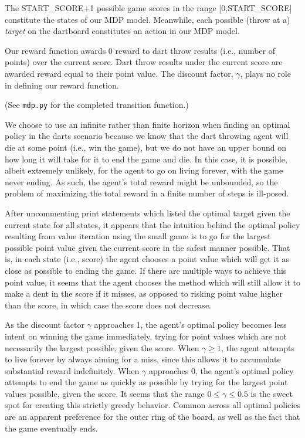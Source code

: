 \documentclass[solution, letterpaper]{cs121}
\begin{document}

\subproblem{} %
The \textsc{START\_SCORE}+1 possible game scores in the range [0,\textsc{START\_SCORE}] constitute the states of our MDP model. Meanwhile, each possible (throw at a) \emph{target} on the dartboard constitutes an action in our MDP model.

\subproblem{} %
Our reward function awards 0 reward to dart throw results (i.e., number of points) over the current score. Dart throw results under the current score are awarded reward equal to their point value. The discount factor, $\gamma$, plays no role in defining our reward function.

\subproblem{} %
(See {\tt mdp.py} for the completed transition function.)

\subproblem{} %
We choose to use an infinite rather than finite horizon when finding an optimal policy in the darts scenario because we know that the dart throwing agent will die at some point (i.e., win the game), but we do not have an upper bound on how long it will take for it to end the game and die. In this case, it is possible, albeit extremely unlikely, for the agent to go on living forever, with the game never ending. As such, the agent's total reward might be unbounded, so the problem of maximizing the total reward in a finite number of steps is ill-posed.

\subproblem{} %
After uncommenting print statements which listed the optimal target given the current state for all states, it appears that the intuition behind the optimal policy resulting from value iteration using the small game is to go for the largest possible point value given the current score in the safest manner possible. That is, in each state (i.e., score) the agent chooses a point value which will get it as close as possible to ending the game. If there are multiple ways to achieve this point value, it seems that the agent chooses the method which will still allow it to make a dent in the score if it misses, as opposed to risking point value higher than the score, in which case the score does not decrease.

\subproblem{} %
As the discount factor $\gamma$ approaches 1, the agent's optimal policy becomes less intent on winning the game immediately, trying for point values which are not necessarily the largest possible, given the score. When $\gamma \geq 1$, the agent attempts to live forever by always aiming for a miss, since this allows it to accumulate substantial reward indefinitely. When $\gamma$ approaches 0, the agent's optimal policy attempts to end the game as quickly as possible by trying for the largest point values possible, given the score. It seems that the range $0 \leq \gamma \leq 0.5$ is the sweet
%  
spot for creating this strictly greedy behavior. Common across all optimal policies are an apparent preference for the outer ring of the board, as well as the fact that the game eventually ends.
\end{document}
